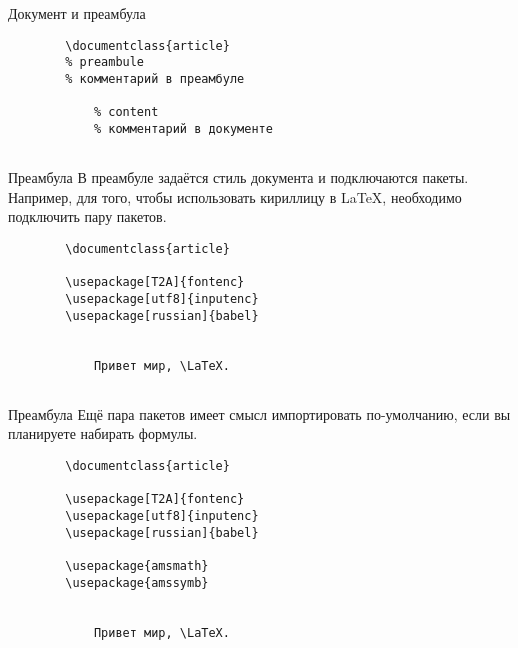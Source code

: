 \begin{frame}[fragile]{Документ и преамбула}
	
	
	
	
	\begin{verbatim}
		\documentclass{article}
		% preambule
		% комментарий в преамбуле
		
			% content
			% комментарий в документе
		
	\end{verbatim}
	
\end{frame}


\begin{frame}[fragile]{Преамбула}
	В преамбуле задаётся стиль документа и подключаются пакеты. Например, для того, чтобы использовать кириллицу в \LaTeX, необходимо подключить пару пакетов.
	
	\begin{verbatim}
		\documentclass{article}
		
		\usepackage[T2A]{fontenc}
		\usepackage[utf8]{inputenc}
		\usepackage[russian]{babel}
		
		
			Привет мир, \LaTeX.
		
	\end{verbatim}
		
\end{frame}


\begin{frame}[fragile]{Преамбула}
	Ещё пара пакетов имеет смысл импортировать по-умолчанию, если вы планируете набирать формулы. 
	
	\begin{verbatim}
		\documentclass{article}
		
		\usepackage[T2A]{fontenc}
		\usepackage[utf8]{inputenc}
		\usepackage[russian]{babel}
		
		\usepackage{amsmath}
		\usepackage{amssymb}
		
		
			Привет мир, \LaTeX.
		
	\end{verbatim}
	
\end{frame}


